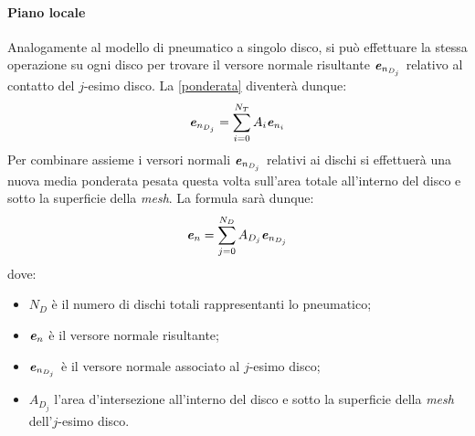 \paragraph{Piano locale}
Analogamente al modello di pneumatico a singolo disco, si può effettuare la stessa operazione su ogni disco per trovare il versore normale risultante $\textbf{\textit{e}}_{n_{D_j}}$ relativo al contatto del $j$-esimo disco. La \eqref{ponderata} diventerà dunque:
%
\begin{equation}
\textbf{\textit{e}}_{n_{D_j}} = \sum_{i=0}^{N_T}A_i\textbf{\textit{e}}_{n_i}
\end{equation}
%
Per combinare assieme i versori normali $\textbf{\textit{e}}_{n_{D_j}}$ relativi ai dischi si effettuerà una nuova media ponderata pesata questa volta sull'area totale all'interno del disco e sotto la superficie della \textit{mesh}. La formula sarà dunque:
%
\begin{equation}
\textbf{\textit{e}}_n = \sum_{j=0}^{N_D}A_{D_j}\textbf{\textit{e}}_{n_{D_j}}
\end{equation}
%
dove:
\begin{itemize}
	\item $N_D$ è il numero di dischi totali rappresentanti lo pneumatico;
	\item $\textbf{\textit{e}}_n$ è il versore normale risultante;
	\item $\textbf{\textit{e}}_{n_{D_j}}$ è il versore normale associato al $j$-esimo disco;
	\item $A_{D_j}$ l'area d'intersezione all'interno del disco e sotto la superficie della \textit{mesh} dell'$j$-esimo disco.
\end{itemize}

